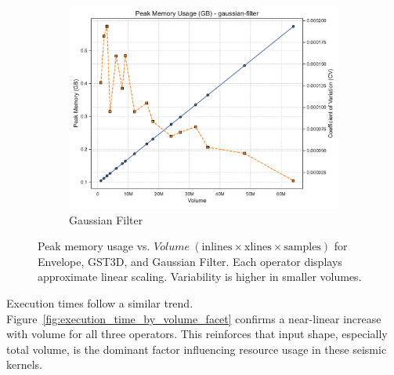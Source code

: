 \begin{figure}[htbp]
\begin{subfigure}[t]{0.32\textwidth}
        \includegraphics[width=\textwidth]{assets/images/05/peak_memory_by_volume_gaussian-filter}
        \caption{Gaussian Filter}
    \end{subfigure}
    \caption{Peak memory usage vs. $Volume~(\text{inlines} \times \text{xlines} \times \text{samples})$ for Envelope, \ac{GST3D}, and Gaussian Filter. Each operator displays approximate linear scaling. Variability is higher in smaller volumes.}
    \label{fig:peak_memory_facet}
\end{figure}

Execution times follow a similar trend.
Figure~\ref{fig:execution_time_by_volume_facet} confirms a near-linear increase with volume for all three operators.
This reinforces that input shape, especially total volume, is the dominant factor influencing resource usage in these seismic kernels.

